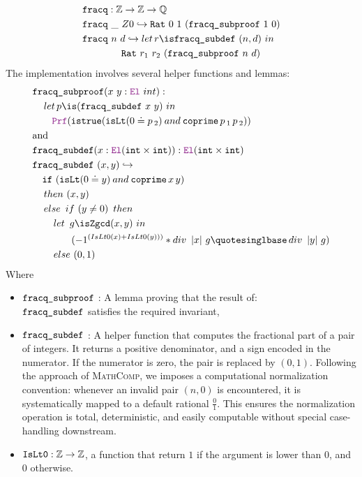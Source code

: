 \begin{definition}\label{def:fracq-def}
\begin{align*}
& \kw{fracq} : \Z \ra \Z \ra \Q \\
& \kw{fracq}~\_~Z0 \re \kw{Rat}~0~1~(\kw{fracq\_subproof}~1~0) \\
& \kw{fracq}~n~d \re \mathop{let} r \is \kw{fracq\_subdef}~(n, d)~\mathbin{in}\\
& \qquad \qquad \kw{Rat}~r_1~r_2~(\kw{fracq\_subproof}~n~d) \\
\end{align*}
The implementation involves several helper functions and lemmas:
\begin{align*}
&\kw{fracq\_subproof} (x~y : \el~int): \\
& \quad \mathop{let} p \is (\kw{fracq\_subdef}~x~y)~ \mathbin{in}\\
& \qquad \prf (\kw{istrue} (\kw{isLt} (0 \doteq p\,{}_2) \mathbin{and} \kw{coprime}\,p\,{}_1\,p\,{}_2)) \\
&\text{and}\\
& \kw{fracq\_subdef} (x : \el (\kw{int} \times \kw{int})): \el (\kw{int} \times \kw{int}) \\
& \kw{fracq\_subdef}~(x, y) \re\\
& \quad \kw{if}~(\kw{isLt} (0 \doteq y) \mathbin{and} \kw{coprime}\,x\,y)\\
& \quad \mathop{then}~(x,y) \\
& \quad \mathop{else}~\mathop{if}~(y \neq 0)~\mathop{then} \\
& \qquad \mathop{let}~g \is \kw{Zgcd}(x,y)~ \mathbin{in}  \\
& \qquad\qquad (-1^{(IsLt0(x) + IsLt0(y)))} * \mathop{div}~|x|~g‚ \mathop{div}~|y|~g) \\
& \qquad \mathop{else}~(0,1) \\
\end{align*}
Where
\begin{itemize}
\item $\texttt{\upshape{fracq\_subproof}}$ :  A lemma proving that the result of:\\
  $\texttt{\upshape{fracq\_subdef}}$ satisfies the required invariant,
\item $\texttt{\upshape{fracq\_subdef}}$ : A helper function that computes the fractional part of a pair of integers.
It returns a positive denominator, and a sign encoded in the numerator. If the numerator is zero, the pair is replaced by $(0, 1)$.
Following the approach of \textsc{MathComp}, we imposes a computational normalization convention: whenever an invalid pair $(n, 0)$ is encountered, it is systematically mapped to a default rational $\frac{0}{1}$.
This ensures the normalization operation is total, deterministic, and easily computable without special case-handling downstream.

\item $\texttt{\upshape{IsLt0}}: \mathbb{Z} \rightarrow \mathbb{Z}$, a function that return $1$ if the argument is lower than $0$, and $0$ otherwise.
\end{itemize}
\end{definition}

